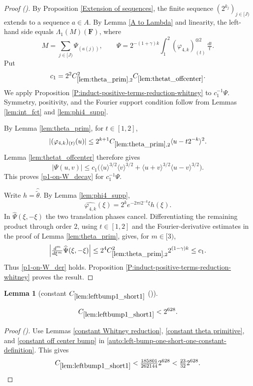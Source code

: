 \documentclass[12pt,reqno]{amsart}
\newcommand{\auto}{{({\tiny\faCar})}}
\theoremstyle{plain}
\newtheorem{lemma}[theorem]{Lemma}
\numberwithin{equation}{section}
\theoremstyle{remark}
\newcommand{\uses}[1]{}
\newcommand{\usesdefs}[1]{}
\newcommand{\leanok}{}
\newcommand{\lean}[1]{}
\newcommand{\F}{\mathbf{F}}
\begin{document}
\begin{proof}[Proof \auto]
By Proposition \ref{Extension of sequences}, the finite sequence $(2^{k_j})_{j\in[J)}$ extends to a sequence $a\in A$. By Lemma \ref{A to Lambda} and linearity, the left-hand side equals $\Lambda_1(M)(\F)$, where
\[
M=\sum_{j\in[J)}\Psi_{(a(j))},
\qquad
\Psi=2^{-(1+\gamma)k}\int_1^2(\varphi_{4,k})_{(t)}^{\otimes2}\,\tfrac{dt}{t}.
\]
Put
\[
c_1=2^2C_{\ref{lem:theta_prim},2}^2C_{\ref{lem:thetat_offcenter}}.
\]
We apply Proposition \ref{P:induct-positive-terms-reduction-whitney} to $c_1^{-1}\Psi$. Symmetry, positivity, and the Fourier support condition follow from Lemmas \ref{lem:int_fct} and \ref{lem:phi4_supp}.

By Lemma \ref{lem:theta_prim}, for $t\in[1,2]$,
\[
|(\varphi_{4,k})_{(t)}(u)|
\le2^{k+1}C_{\ref{lem:theta_prim},2}
\langle u-t2^{-k}\rangle^2.
\]
Lemma \ref{lem:thetat_offcenter} therefore gives
\[
|\Psi(u,v)|
\le c_1\bigl(
\langle u\rangle^{3/2}\langle v\rangle^{3/2}
+\langle u+v\rangle^{3/2}\langle u-v\rangle^{3/2}
\bigr).
\]
This proves \eqref{p1-on-W_decay} for $c_1^{-1}\Psi$.

Write $h=\widehat{\widetilde\theta}$. By Lemma \ref{lem:phi4_supp},
\[
\widehat{\varphi_{4,k}}(\xi)
=2^ke^{-2\pi i2^{-k}\xi}h(\xi).
\]
In $\widehat\Psi(\xi,-\xi)$ the two translation phases cancel. Differentiating the remaining product through order $2$, using $t\in[1,2]$ and the Fourier-derivative estimates in the proof of Lemma \ref{lem:theta_prim}, gives, for $m\in[3)$,
\[
\left|\tfrac{d^m}{d\xi^m}\widehat\Psi(\xi,-\xi)\right|
\le2^4C_{\ref{lem:theta_prim},2}^2 2^{(1-\gamma)k}
\le c_1.
\]
Thus \eqref{p1-on-W_der} holds. Proposition \ref{P:induct-positive-terms-reduction-whitney} proves the result.
\end{proof}

\begin{lemma}[constant $C_{\ref{lem:leftbump1_short1}}$ \auto]\label{constant left bump one short one}\uses{constant Whitney reduction,constant theta primitive,constant off center bump,lem:leftbump1_short1}\usesdefs{}
\lean{Auto.constantLeftBumpOneShortOne}
\leanok
\begin{equation}\label{constant left bump one short one bound}
C_{\ref{lem:leftbump1_short1}}
<2^{628}.
\end{equation}
\end{lemma}
\begin{proof}[Proof \auto]
Use Lemmas \ref{constant Whitney reduction}, \ref{constant theta primitive}, and \ref{constant off center bump} in \eqref{auto:left-bump-one-short-one-constant-definition}. This gives
\[
C_{\ref{lem:leftbump1_short1}}
<\tfrac{185801}{262144}2^{628}
<\tfrac{23}{32}2^{628}.
\]
\end{proof}
\end{document}
